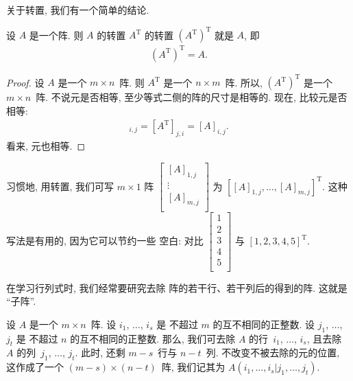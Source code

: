 关于转置, 我们有一个简单的结论.

\begin{theorem}
    设 \(A\) 是一个阵.
    则 \(A\) 的转置 \(A^{\mathrm{T}}\) 的转置
    \((A^{\mathrm{T}})^{\mathrm{T}}\)
    就是 \(A\),
    即
    \begin{align*}
        (A^{\mathrm{T}})^{\mathrm{T}} = A.
    \end{align*}
\end{theorem}

\begin{proof}
    设 \(A\) 是一个 \(m \times n\)~阵.
    则 \(A^{\mathrm{T}}\) 是一个 \(n \times m\)~阵.
    所以,
    \((A^{\mathrm{T}})^{\mathrm{T}}\) 是一个 \(m \times n\)~阵.
    不说元是否相等, 至少等式二侧的阵的尺寸是相等的.
    现在, 比较元是否相等:
    \begin{align*}
        [(A^{\mathrm{T}})^{\mathrm{T}}]_{i,j}
            = [A^{\mathrm{T}}]_{j,i}
            = [A]_{i,j}.
    \end{align*}
    看来, 元也相等.
\end{proof}

习惯地, 用转置, 我们可写 \(m \times 1\) 阵
\(
\begin{bmatrix}
    [A]_{1,j} \\
    \vdots    \\
    [A]_{m,j} \\
\end{bmatrix}
\)
为
\(
[ [A]_{1,j}, \dots, [A]_{m,j} ]^{\mathrm{T}}
\).
这种写法是有用的,
因为它可以节约一些%
空白:
对比
\(
\begin{bmatrix}
    1 \\
    2 \\
    3 \\
    4 \\
    5 \\
\end{bmatrix}
\)
与
\(
[1, 2, 3, 4, 5]^{\mathrm{T}}
\).

\vspace{2ex}

在学习行列式时, 我们经常要研究去除%
阵的若干行、若干列后的得到的阵.
这就是 ``子阵''.

\begin{definition}[子阵, 1]
    设 \(A\) 是一个 \(m \times n\)~阵.
    设 \(i_1\), \(\dots\), \(i_s\) 是%
    不超过 \(m\) 的互不相同的正整数.
    设 \(j_1\), \(\dots\), \(j_t\) 是%
    不超过 \(n\) 的互不相同的正整数.
    那么, 我们可去除 \(A\) 的行~\(i_1\), \(\dots\), \(i_s\),
    且去除 \(A\) 的列~\(j_1\), \(\dots\), \(j_t\).
    此时, 还剩 \(m - s\)~行与 \(n - t\)~列.
    不改变不被去除的元的位置,
    这作成了一个 \((m - s) \times (n - t)\)~阵,
    我们记其为
    \(A({i_1, \dots, i_s}|{j_1, \dots, j_t})\).
\end{definition}

